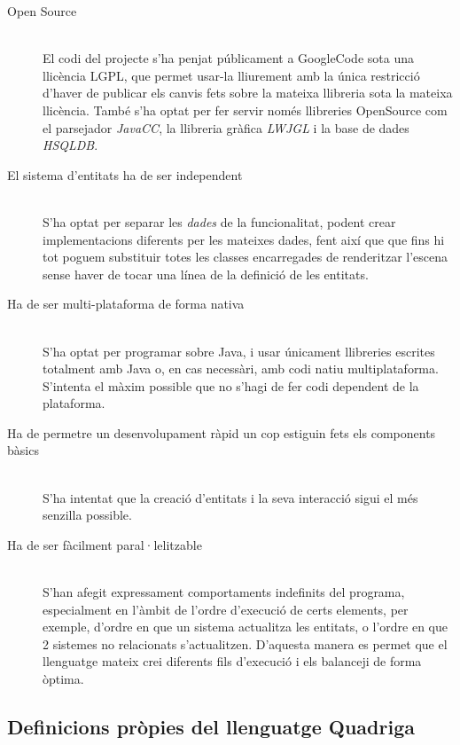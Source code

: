\begin{description}
  \item[Open Source] \hfill \\
    El codi del projecte s'ha penjat públicament a GoogleCode sota una llicència LGPL, que permet usar-la lliurement amb la única restricció d'haver de publicar els canvis fets sobre la mateixa llibreria sota la mateixa llicència. També s'ha optat per fer servir només llibreries OpenSource com el parsejador {\em JavaCC}, la llibreria gràfica {\em LWJGL} i la base de dades {\em HSQLDB}.
    
  \item[El sistema d'entitats ha de ser independent] \hfill \\
    S'ha optat per separar les {\em dades} de la funcionalitat, podent crear implementacions diferents per les mateixes dades, fent així que que fins hi tot poguem substituir totes les classes encarregades de renderitzar l'escena sense haver de tocar una línea de la definició de les entitats.
    
  \item[Ha de ser multi-plataforma de forma nativa] \hfill \\
    S'ha optat per programar sobre Java, i usar únicament llibreries escrites totalment amb Java o, en cas necessàri, amb codi natiu multiplataforma. S'intenta el màxim possible que no s'hagi de fer codi dependent de la plataforma.
    
  \item[Ha de permetre un desenvolupament ràpid un cop estiguin fets els components bàsics] \hfill \\
    S'ha intentat que la creació d'entitats i la seva interacció sigui el més senzilla possible.
    
  \item[Ha de ser fàcilment paral·lelitzable] \hfill \\
    S'han afegit expressament comportaments indefinits del programa, especialment en l'àmbit de l'ordre d'execució de certs elements, per exemple, d'ordre en que un sistema actualitza les entitats, o l'ordre en que 2 sistemes no relacionats s'actualitzen. D'aquesta manera es permet que el llenguatge mateix crei diferents fils d'execució i els balanceji de forma òptima.
\end{description}

\subsection{Definicions pròpies del llenguatge Quadriga}

